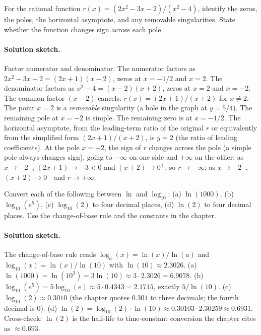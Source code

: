 \begin{exercise}
For the rational function $r(x) = (2x^{2} - 3x - 2)/(x^{2} - 4)$,
identify the zeros, the poles, the horizontal asymptote, and any
removable singularities. State whether the function changes sign
across each pole.

\paragraph{Solution sketch.}
Factor numerator and denominator. The numerator factors as
$2x^{2} - 3x - 2 = (2x + 1)(x - 2)$, zeros at $x = -1/2$ and $x =
2$. The denominator factors as $x^{2} - 4 = (x - 2)(x + 2)$, zeros
at $x = 2$ and $x = -2$. The common factor $(x - 2)$ cancels:
$r(x) = (2x + 1)/(x + 2)$ for $x \neq 2$. The point $x = 2$ is a
\emph{removable} singularity (a hole in the graph at $y = 5/4$).
The remaining pole at $x = -2$ is simple. The remaining zero is at
$x = -1/2$. The horizontal asymptote, from the leading-term ratio
of the original $r$ or equivalently from the simplified form
$(2x + 1)/(x + 2)$, is $y = 2$ (the ratio of leading coefficients).
At the pole $x = -2$, the sign of $r$ changes across the pole (a
simple pole always changes sign), going to $-\infty$ on one side and
$+\infty$ on the other: as $x \to -2^{+}$, $(2x + 1) \to -3 < 0$
and $(x + 2) \to 0^{+}$, so $r \to -\infty$; as $x \to -2^{-}$,
$(x + 2) \to 0^{-}$ and $r \to +\infty$.
\end{exercise}

\begin{exercise}
Convert each of the following between $\ln$ and $\log_{10}$:
(a) $\ln(1000)$, (b) $\log_{10}(e^{5})$, (c) $\log_{10}(2)$ to four
decimal places, (d) $\ln(2)$ to four decimal places. Use the
change-of-base rule and the constants in the chapter.

\paragraph{Solution sketch.}
The change-of-base rule reads $\log_{a}(x) = \ln(x)/\ln(a)$ and
$\log_{10}(x) = \ln(x)/\ln(10)$ with $\ln(10) \approx 2.3026$.
(a) $\ln(1000) = \ln(10^{3}) = 3 \ln(10) \approx 3 \cdot 2.3026
= 6.9078$.
(b) $\log_{10}(e^{5}) = 5 \log_{10}(e) \approx 5 \cdot 0.4343
= 2.1715$, exactly $5/\ln(10)$.
(c) $\log_{10}(2) \approx 0.3010$ (the chapter quotes $0.301$ to
three decimals; the fourth decimal is $0$).
(d) $\ln(2) = \log_{10}(2) \cdot \ln(10) \approx 0.30103 \cdot
2.30259 \approx 0.6931$. Cross-check: $\ln(2)$ is the half-life
to time-constant conversion the chapter cites as $\approx 0.693$.
\end{exercise}

